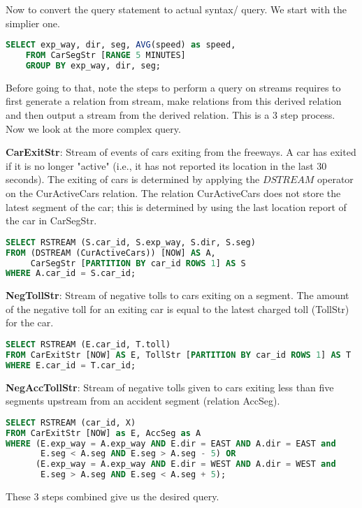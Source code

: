 Now to convert the query statement to actual syntax/ query. We start with the simplier one.
\begin{lstlisting}[language=SQL]
    SELECT exp_way, dir, seg, AVG(speed) as speed,
    FROM CarSegStr [RANGE 5 MINUTES]
    GROUP BY exp_way, dir, seg;
\end{lstlisting}





Before going to that, note the steps to perform a query on streams requires to first generate a relation from stream, make relations from this derived relation and then output a stream from the derived relation. This is a 3 step process. \\
Now we look at the more complex query.
\par  \textbf{CarExitStr}: Stream of events of cars exiting from the freeways. A car has exited if it is no longer "active" (i.e., it has not reported its location in the last $30$ seconds). The exiting of cars is determined by applying the $DSTREAM$ operator on the CurActiveCars relation. The relation CurActiveCars does not store the latest segment of the car; this is determined by using the last location report of the car in CarSegStr. 
\begin{lstlisting}[language=SQL]
SELECT RSTREAM (S.car_id, S.exp_way, S.dir, S.seg)
FROM (DSTREAM (CurActiveCars)) [NOW] AS A,
     CarSegStr [PARTITION BY car_id ROWS 1] AS S
WHERE A.car_id = S.car_id;
\end{lstlisting}
\textbf{NegTollStr}: Stream of negative tolls to cars exiting on a segment. The amount of the negative toll for an exiting car is equal to the latest charged toll (TollStr) for the car. 
\begin{lstlisting}[language=SQL]
SELECT RSTREAM (E.car_id, T.toll)
FROM CarExitStr [NOW] AS E, TollStr [PARTITION BY car_id ROWS 1] AS T
WHERE E.car_id = T.car_id;
\end{lstlisting}
\textbf{NegAccTollStr}: Stream of negative tolls given to cars exiting less than five segments upstream from an accident segment (relation AccSeg). 
\begin{lstlisting}[language=SQL]
SELECT RSTREAM (car_id, X)
FROM CarExitStr [NOW] as E, AccSeg as A
WHERE (E.exp_way = A.exp_way AND E.dir = EAST AND A.dir = EAST and 
       E.seg < A.seg AND E.seg > A.seg - 5) OR
      (E.exp_way = A.exp_way AND E.dir = WEST AND A.dir = WEST and 
       E.seg > A.seg AND E.seg < A.seg + 5);
\end{lstlisting}
These 3 steps combined give us the desired query.




